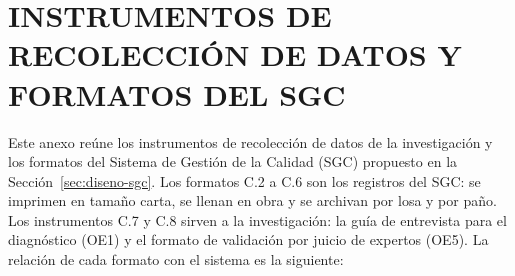 \chapter{INSTRUMENTOS DE RECOLECCIÓN DE DATOS Y FORMATOS DEL SGC}
\label{anx:instrumentos}

\providecommand{\casilla}{\framebox[1.9ex]{\rule{0pt}{1.3ex}}}
\providecommand{\campo}[1]{#1~\hrulefill}
\providecommand{\fila}{\rule{0pt}{0.58cm}}
\providecommand{\firma}[1]{\parbox[b]{3.7cm}{\centering\rule{0pt}{0.75cm}\rule{3.4cm}{0.4pt}\\[-1pt]{\scriptsize #1}}}
\newcommand{\cabeceraformato}[2]{%
  \par\noindent{\footnotesize\setstretch{1}%
  \renewcommand{\arraystretch}{1.35}%
  \begin{tabular}{@{}|p{0.29\linewidth}|p{0.43\linewidth}|p{0.18\linewidth}|@{}}
  \hline
  \textbf{UATF -- Edificio de Posgrado} & \multirow{2}{=}{\centering\textbf{#2}} & \textbf{Código:} #1 \\
  Ítem 13: losa alivianada h~=~25~cm & & Versión 0 \\
  \hline
  \end{tabular}\par}\smallskip}

Este anexo reúne los instrumentos de recolección de datos de la investigación y los formatos del Sistema de Gestión de la Calidad (SGC) propuesto en la Sección~\ref{sec:diseno-sgc}. Los formatos C.2 a C.6 son los registros del SGC: se imprimen en tamaño carta, se llenan en obra y se archivan por losa y por paño. Los instrumentos C.7 y C.8 sirven a la investigación: la guía de entrevista para el diagnóstico (OE1) y el formato de validación por juicio de expertos (OE5). La relación de cada formato con el sistema es la siguiente:

